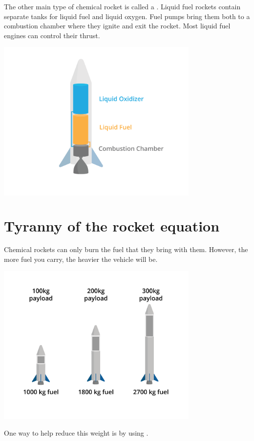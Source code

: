 The other main type of chemical rocket is called a . Liquid fuel rockets contain separate tanks for liquid fuel and liquid oxygen. Fuel pumps bring them both to a combustion chamber where they ignite and exit the rocket. Most liquid fuel engines can control their thrust. 


\includegraphics[width=0.75\textwidth]{liquid.png}


\section{Tyranny of the rocket equation}
	Chemical rockets can only burn the fuel that they bring with them. However, the more fuel you carry, the heavier the vehicle will be.
	
	\includegraphics[width=0.75\textwidth]{rocketFuelWeight.png}
 

	One way to help reduce this weight is by using . 

